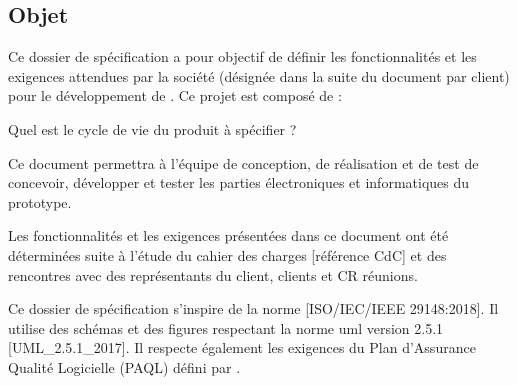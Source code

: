 \subsection{Objet} %

Ce dossier de spécification a pour objectif de définir les fonctionnalités et les exigences attendues par la société {\clientName} 
(désignée dans la suite du document par \gls{client}) pour le développement de \complete. Ce projet est composé de :
\complete

\complete Quel est le cycle de vie du produit à spécifier ?

Ce document permettra à l'équipe de conception, de réalisation et de test de concevoir, développer et tester les parties électroniques
et informatiques du prototype. \newline

Les fonctionnalités et les exigences présentées dans ce document ont été déterminées suite à l'étude du cahier des charges 
[\complete référence CdC] et des rencontres avec des représentants du \gls{client}, \complete clients et CR réunions.\newline

Ce dossier de spécification s'inspire de la norme [ISO/IEC/IEEE 29148:2018]. Il utilise des schémas et des figures respectant la norme \gls{uml} version 2.5.1 [UML\_2.5.1\_2017]. 
Il respecte également les exigences du Plan d'Assurance Qualité Logicielle (PAQL) défini par \teamCompany. %